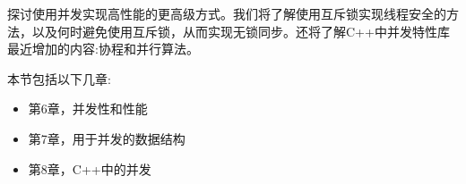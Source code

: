 探讨使用并发实现高性能的更高级方式。我们将了解使用互斥锁实现线程安全的方法，以及何时避免使用互斥锁，从而实现无锁同步。还将了解C++中并发特性库最近增加的内容:协程和并行算法。

本节包括以下几章:

\begin{itemize}
\item 第6章，并发性和性能
\item 第7章，用于并发的数据结构
\item 第8章，C++中的并发
\end{itemize}

